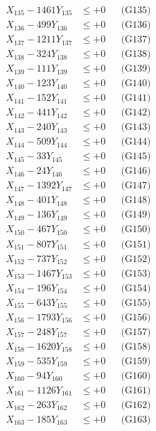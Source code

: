 \documentclass[a4paper,10pt]{article}
\begin{document}
{\begin{align}
X_{135} - 1461Y_{135} &\leq +0 && \text{(G135)} \\
X_{136} - 499Y_{136} &\leq +0 && \text{(G136)} \\
X_{137} - 1211Y_{137} &\leq +0 && \text{(G137)} \\
X_{138} - 324Y_{138} &\leq +0 && \text{(G138)} \\
X_{139} - 111Y_{139} &\leq +0 && \text{(G139)} \\
X_{140} - 123Y_{140} &\leq +0 && \text{(G140)} \\
\allowbreak
X_{141} - 152Y_{141} &\leq +0 && \text{(G141)} \\
X_{142} - 441Y_{142} &\leq +0 && \text{(G142)} \\
X_{143} - 240Y_{143} &\leq +0 && \text{(G143)} \\
X_{144} - 509Y_{144} &\leq +0 && \text{(G144)} \\
X_{145} - 33Y_{145} &\leq +0 && \text{(G145)} \\
X_{146} - 24Y_{146} &\leq +0 && \text{(G146)} \\
X_{147} - 1392Y_{147} &\leq +0 && \text{(G147)} \\
X_{148} - 401Y_{148} &\leq +0 && \text{(G148)} \\
X_{149} - 136Y_{149} &\leq +0 && \text{(G149)} \\
X_{150} - 467Y_{150} &\leq +0 && \text{(G150)} \\
\allowbreak
X_{151} - 807Y_{151} &\leq +0 && \text{(G151)} \\
X_{152} - 737Y_{152} &\leq +0 && \text{(G152)} \\
X_{153} - 1467Y_{153} &\leq +0 && \text{(G153)} \\
X_{154} - 196Y_{154} &\leq +0 && \text{(G154)} \\
X_{155} - 643Y_{155} &\leq +0 && \text{(G155)} \\
X_{156} - 1793Y_{156} &\leq +0 && \text{(G156)} \\
X_{157} - 248Y_{157} &\leq +0 && \text{(G157)} \\
X_{158} - 1620Y_{158} &\leq +0 && \text{(G158)} \\
X_{159} - 535Y_{159} &\leq +0 && \text{(G159)} \\
X_{160} - 94Y_{160} &\leq +0 && \text{(G160)} \\
\allowbreak
X_{161} - 1126Y_{161} &\leq +0 && \text{(G161)} \\
X_{162} - 263Y_{162} &\leq +0 && \text{(G162)} \\
X_{163} - 185Y_{163} &\leq +0 && \text{(G163)} \\

\end{align}}
\end{document}
